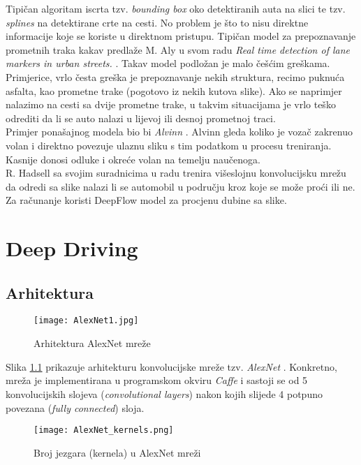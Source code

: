 \documentclass[seminar, utf8, numeric]{fer}
\begin{document}
Tipičan algoritam iscrta tzv. \textit{bounding box} oko detektiranih auta na slici te tzv. \textit{splines} na detektirane crte na cesti. No problem je što to nisu direktne informacije koje se koriste u direktnom pristupu. Tipičan model za prepoznavanje prometnih traka kakav predlaže M. Aly u svom radu \textit{Real time detection of lane markers in urban streets.} \cite{lda}. Takav model podložan je malo češćim greškama. Primjerice, vrlo česta greška je prepoznavanje nekih struktura, recimo puknuća asfalta, kao prometne trake (pogotovo iz nekih kutova slike). Ako se naprimjer nalazimo na cesti sa dvije prometne trake, u takvim situacijama je vrlo teško odrediti da li se auto nalazi u lijevoj ili desnoj prometnoj traci. \\
Primjer ponašajnog modela bio bi \textit{Alvinn} \cite{BehaviouralModel}. Alvinn gleda koliko je vozač zakrenuo volan i direktno povezuje ulaznu sliku s tim podatkom u procesu treniranja. Kasnije donosi odluke i okreće volan na temelju naučenoga. \\
R. Hadsell sa svojim suradnicima u radu \cite{longRangeVision} trenira višeslojnu konvolucijsku mrežu da odredi sa slike nalazi li se automobil u području kroz koje se može proći ili ne. Za računanje koristi DeepFlow model \cite{deepFlow} za procjenu dubine sa slike.


\chapter{Deep Driving} 

\section{Arhitektura}

\begin{figure}[h]
\centering
\texttt{[image: AlexNet1.jpg]}
\caption{Arhitektura AlexNet mreže}
\label{fig:alexNet_1}
\end{figure}

Slika \ref{fig:alexNet_1} prikazuje arhitekturu konvolucijske mreže tzv. \textit{AlexNet} \cite{alexNet}. Konkretno, mreža je implementirana u programskom okviru \textit{Caffe} i sastoji se od 5 konvolucijskih slojeva (\textit{convolutional layers}) nakon kojih slijede 4 potpuno povezana (\textit{fully connected}) sloja. 

\begin{figure}[ht]
\centering
\texttt{[image: AlexNet\_kernels.png]}
\caption{Broj jezgara (kernela) u AlexNet mreži}
\label{fig:alexNet_kernels}
\end{figure}
\end{document}
